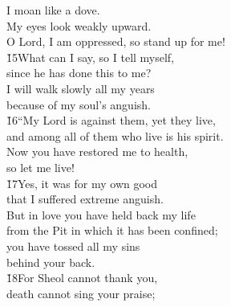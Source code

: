 \begin{poetry}
\poemll    I moan like a dove. \\
\poeml My eyes look weakly upward. \\
\poemll    O Lord, I am oppressed, so stand up for me! \\
\poeml \v{15}What can I say, so I tell myself, \\
\poemll    since he has done this to me? \\
\poeml I will walk slowly all my years \\
\poemll    because of my soul's anguish. \\
\poeml \v{16}``My Lord is against them, yet they live, \\
\poemll    and among all of them who live is his spirit. \\
\poeml Now you have restored me to health, \\
\poemll    so let me live! \\
\poeml \v{17}Yes, it was for my own good \\
\poemll    that I suffered extreme anguish. \\
\poeml But in love you have held back my life \\
\poemll    from the Pit in which it has been confined; \\
\poeml you have tossed all my sins \\
\poemll    behind your back. \\
\poeml \v{18}For Sheol cannot thank you, \\
\poemll    death cannot sing your praise; \\

\end{poetry}
